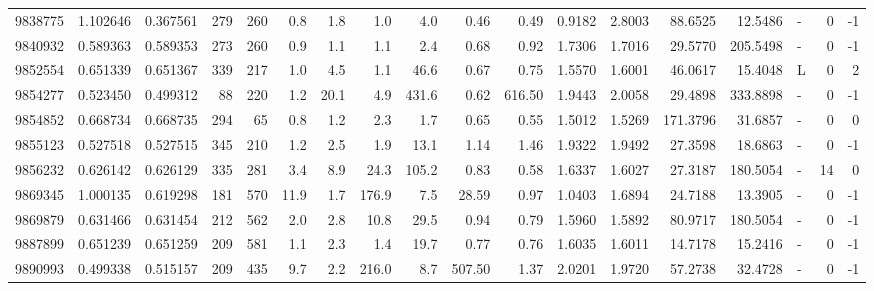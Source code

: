 \begin{tabular}{rrrrrrrrrrrrrrrlrr}
   9838775 & 1.102646 &   0.367561 &  279 &  260 &      0.8 &      1.8 &     1.0 &      4.0 &       0.46 &        0.49 &  0.9182 &  2.8003 &   88.6525 &   12.5486 &             - &        0 &         -1 \\
   9840932 & 0.589363 &   0.589353 &  273 &  260 &      0.9 &      1.1 &     1.1 &      2.4 &       0.68 &        0.92 &  1.7306 &  1.7016 &   29.5770 &  205.5498 &             - &        0 &         -1 \\
   9852554 & 0.651339 &   0.651367 &  339 &  217 &      1.0 &      4.5 &     1.1 &     46.6 &       0.67 &        0.75 &  1.5570 &  1.6001 &   46.0617 &   15.4048 &             L &        0 &          2 \\
   9854277 & 0.523450 &   0.499312 &   88 &  220 &      1.2 &     20.1 &     4.9 &    431.6 &       0.62 &      616.50 &  1.9443 &  2.0058 &   29.4898 &  333.8898 &             - &        0 &         -1 \\
   9854852 & 0.668734 &   0.668735 &  294 &   65 &      0.8 &      1.2 &     2.3 &      1.7 &       0.65 &        0.55 &  1.5012 &  1.5269 &  171.3796 &   31.6857 &             - &        0 &          0 \\
   9855123 & 0.527518 &   0.527515 &  345 &  210 &      1.2 &      2.5 &     1.9 &     13.1 &       1.14 &        1.46 &  1.9322 &  1.9492 &   27.3598 &   18.6863 &             - &        0 &         -1 \\
   9856232 & 0.626142 &   0.626129 &  335 &  281 &      3.4 &      8.9 &    24.3 &    105.2 &       0.83 &        0.58 &  1.6337 &  1.6027 &   27.3187 &  180.5054 &             - &       14 &          0 \\
   9869345 & 1.000135 &   0.619298 &  181 &  570 &     11.9 &      1.7 &   176.9 &      7.5 &      28.59 &        0.97 &  1.0403 &  1.6894 &   24.7188 &   13.3905 &             - &        0 &         -1 \\
   9869879 & 0.631466 &   0.631454 &  212 &  562 &      2.0 &      2.8 &    10.8 &     29.5 &       0.94 &        0.79 &  1.5960 &  1.5892 &   80.9717 &  180.5054 &             - &        0 &         -1 \\
   9887899 & 0.651239 &   0.651259 &  209 &  581 &      1.1 &      2.3 &     1.4 &     19.7 &       0.77 &        0.76 &  1.6035 &  1.6011 &   14.7178 &   15.2416 &             - &        0 &         -1 \\
   9890993 & 0.499338 &   0.515157 &  209 &  435 &      9.7 &      2.2 &   216.0 &      8.7 &     507.50 &        1.37 &  2.0201 &  1.9720 &   57.2738 &   32.4728 &             - &        0 &         -1 \\

\end{tabular}
